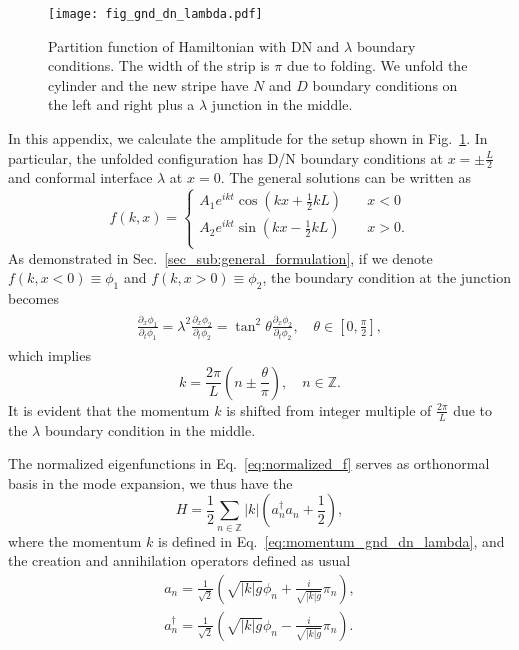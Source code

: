
\begin{figure}[h]
\centering
\texttt{[image: fig\_gnd\_dn\_lambda.pdf]}
\caption{Partition function of Hamiltonian with DN and $\lambda$ boundary conditions. The width of the strip is $\pi$ due to folding. We unfold the cylinder and the new stripe have $N$ and $D$ boundary conditions on the left and right plus a $\lambda$ junction in the middle. }
\label{fig:Fig_gnd_dn_lambda}
\end{figure}

In this appendix, we calculate the amplitude for the setup shown in Fig.~\ref{fig:Fig_gnd_dn_lambda}. In particular, the unfolded configuration has D/N boundary conditions at $x = \pm \frac{L}{2}$ and conformal interface $\lambda$ at $x = 0$. The general solutions can be written as
\begin{equation}
\label{eq:normalized_f}
f(k, x) = 
\left\lbrace
\begin{aligned}
  A_1 e^{i kt} \cos\left(kx +\frac{1}{2}kL \right) &  \quad x < 0  \\
  A_2 e^{ikt}  \sin\left(kx - \frac{1}{2}kL \right) & \quad x > 0 .  \\
\end{aligned} \right. 
\end{equation}
As demonstrated in Sec.~\ref{sec_sub:general_formulation}, if we denote $f(k,x<0)\equiv\phi_1$ and $f(k,x>0)\equiv\phi_2$, the boundary condition at the junction becomes
\begin{eqnarray}\begin{aligned}
\frac{\partial_x \phi_1}{ \partial_t \phi_1} = \lambda^2 \frac{\partial_x \phi_2}{ \partial_t \phi_2} = \tan^2 \theta\frac{\partial_x \phi_2}{ \partial_t \phi_2}, \quad \theta \in \left[0,\frac{\pi}{2} \right]  ,
\end{aligned}\end{eqnarray}
which implies
\begin{equation}
\label{eq:momentum_gnd_dn_lambda}
k = \frac{2\pi}{L}\left( n \pm \frac{\theta}{\pi} \right),  \quad n\in\mathbb{Z}.
\end{equation}
It is evident that the momentum $k$ is shifted from integer multiple of $\frac{2\pi}{L}$ due to the $\lambda$ boundary condition in the middle. 

The normalized eigenfunctions in Eq.~\eqref{eq:normalized_f} serves as orthonormal basis in the mode expansion, we thus have the 
\begin{equation}
\label{eq:H_in_gnd_dn_lambda}
H = \frac{1}{2} \sum_{n \in \mathbb{Z} } |k|  \left(a^{\dagger}_n a_n + \frac{1}{2} \right) ,
\end{equation}
where the momentum $k$ is defined in Eq.~\eqref{eq:momentum_gnd_dn_lambda}, and the creation and annihilation operators defined as usual
\begin{equation}
\begin{aligned}
a_n = \frac{1}{\sqrt{2}} \left( \sqrt{ |k|g} \phi_n + \frac{i }{\sqrt{|k|g} }\pi_n  \right) ,\\
a^{\dagger}_n = \frac{1}{\sqrt{2}} \left( \sqrt{ |k|g} \phi_n - \frac{i }{\sqrt{|k|g} }\pi_n  \right) .\\
\end{aligned}
\end{equation}

